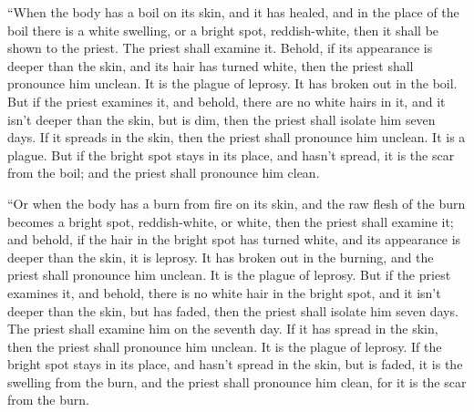 \myverse{}“When the body has a boil on its skin, and it has healed,
\myverse{}and in the place of the boil there is a white swelling, or a bright spot,
reddish-white, then it shall be shown to the priest.
\myverse{}The priest shall examine it. Behold, if its appearance is deeper than the
skin, and its hair has turned white, then the priest shall pronounce him unclean. It is the plague of
leprosy. It has broken out in the boil.
\myverse{}But if the priest examines it, and behold, there are no white hairs in it,
and it isn’t deeper than the skin, but is dim, then the priest shall isolate him seven days.
\myverse{}If it spreads in the skin, then the priest shall pronounce him unclean. It
is a plague.
\myverse{}But if the bright spot stays in its place, and hasn’t spread, it is the scar
from the boil; and the priest shall pronounce him clean.


\myverse{}“Or when the body has a burn from fire on its skin, and the
raw flesh of the burn becomes a bright spot, reddish-white, or white,
\myverse{}then the priest shall examine it; and behold, if the hair in the bright spot
has turned white, and its appearance is deeper than the skin, it is leprosy. It has broken out in the
burning, and the priest shall pronounce him unclean. It is the plague of leprosy.
\myverse{}But if the priest examines it, and behold, there is no white hair in the
bright spot, and it isn’t deeper than the skin, but has faded, then the priest shall isolate him seven
days.
\myverse{}The priest shall examine him on the seventh day. If it has spread in the
skin, then the priest shall pronounce him unclean. It is the plague of leprosy.
\myverse{}If the bright spot stays in its place, and hasn’t spread in the skin, but
is faded, it is the swelling from the burn, and the priest shall pronounce him clean, for it is the scar
from the burn.


